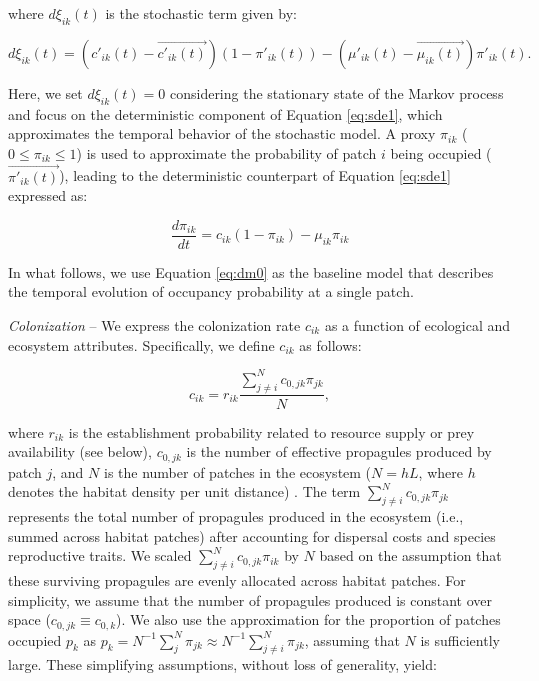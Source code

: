 \documentclass[11pt, class=article, crop=false]{standalone}
\begin{document}
where $d\xi_{ik}(t)$ is the stochastic term given by:

\begin{equation}
    d\xi_{ik}(t) = (c'_{ik}(t) - \overrightarrow{c'_{ik}(t)}) (1 - \pi'_{ik}(t)) - (\mu'_{ik}(t) - \overrightarrow{\mu_{ik}(t)}) \pi'_{ik}(t).
\end{equation}

Here, we set $d\xi_{ik}(t) = 0$ considering the stationary state of the Markov process and focus on the deterministic component of Equation \ref{eq:sde1}, which approximates the temporal behavior of the stochastic model.
A proxy $\pi_{ik}$ ($0 \le \pi_{ik} \le 1$) is used to approximate the probability of patch $i$ being occupied ($\overrightarrow{\pi'_{ik}(t)}$), leading to the deterministic counterpart of Equation \ref{eq:sde1} expressed as:

\begin{equation}
    \frac{d \pi_{ik}}{d t} = c_{ik} (1 - \pi_{ik}) - \mu_{ik} \pi_{ik}
    \label{eq:dm0}
\end{equation}

In what follows, we use Equation \ref{eq:dm0} as the baseline model that describes the temporal evolution of occupancy probability at a single patch.

\textit{Colonization} --
We express the colonization rate $c_{ik}$ as a function of ecological and ecosystem attributes.
Specifically, we define $c_{ik}$ as follows:

\begin{equation}
    c_{ik} = r_{ik} \frac{\sum_{j \ne i}^N c_{0, jk} \pi_{jk}}{N},
    \label{eq:clnz}
\end{equation}

where $r_{ik}$ is the establishment probability related to resource supply or prey availability (see below), $c_{0, jk}$ is the number of effective propagules produced by patch $j$, and $N$ is the number of patches in the ecosystem ($N = hL$, where $h$ denotes the habitat density per unit distance) .
The term $\sum_{j \ne i}^N c_{0, jk} \pi_{jk}$ represents the total number of propagules produced in the ecosystem (i.e., summed across habitat patches) after accounting for dispersal costs and species reproductive traits.
We scaled $\sum_{j \ne i}^N c_{0, jk} \pi_{ik}$ by $N$ based on the assumption that these surviving propagules are evenly allocated across habitat patches.
For simplicity, we assume that the number of propagules produced is constant over space ($c_{0, jk} \equiv c_{0, k}$).
We also use the approximation for the proportion of patches occupied $p_k$ as $p_k = N^{-1}\sum_{j}^N \pi_{jk} \approx N^{-1}\sum_{j \ne i}^N \pi_{jk}$, assuming that $N$ is sufficiently large.
These simplifying assumptions, without loss of generality, yield:
\end{document}
